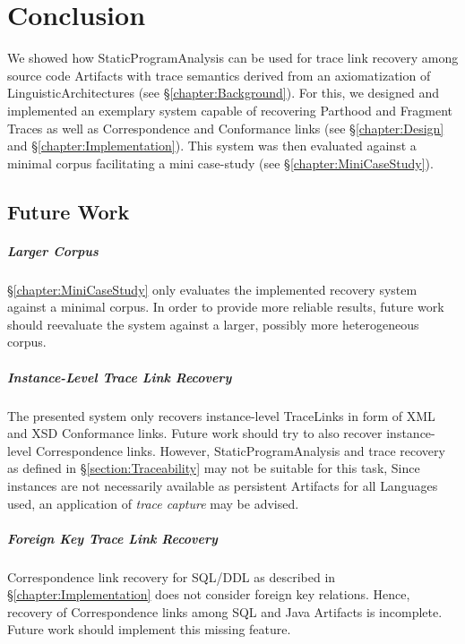 \chapter{Conclusion}
\label{chapter:Conclusion}
We showed how \gls{StaticProgramAnalysis} can be used for trace link recovery among source code \glspl{Artifact} with trace semantics derived from an axiomatization of \glspl{LinguisticArchitecture} (see §\ref{chapter:Background}).
For this, we designed and implemented an exemplary system capable of recovering \gls{Parthood} and \gls{Fragment} \glspl{Trace} as well as \gls{Correspondence} and \gls{Conformance} links (see §\ref{chapter:Design} and §\ref{chapter:Implementation}).
This system was then evaluated against a minimal corpus facilitating a mini case-study (see §\ref{chapter:MiniCaseStudy}).


\section{Future Work}
\label{section:FutureWork}

\paragraph*{Larger Corpus}
§\ref{chapter:MiniCaseStudy} only evaluates the implemented recovery system against a minimal corpus.
In order to provide more reliable results, future work should reevaluate the system against a larger, possibly more heterogeneous corpus.

\paragraph*{Instance-Level Trace Link Recovery}
The presented system only recovers instance-level \glspl{TraceLink} in form of \gls{XML} and \gls{XSD} \gls{Conformance} links.
Future work should try to also recover instance-level \gls{Correspondence} links.
However, \gls{StaticProgramAnalysis} and trace recovery as defined in §\ref{section:Traceability} may not be suitable for this task,
Since instances are not necessarily available as persistent \glspl{Artifact} for all \glspl{Language} used, an application of \textit{trace capture} \cite{DBLP:books/daglib/p/GotelCHZEGDAMM12} may be advised.

\paragraph*{Foreign Key Trace Link Recovery}
\Gls{Correspondence} link recovery for \gls{SQL/DDL} as described in §\ref{chapter:Implementation} does not consider foreign key relations.
Hence, recovery of \gls{Correspondence} links among \gls{SQL} and \gls{Java} \glspl{Artifact} is incomplete.
Future work should implement this missing feature.

